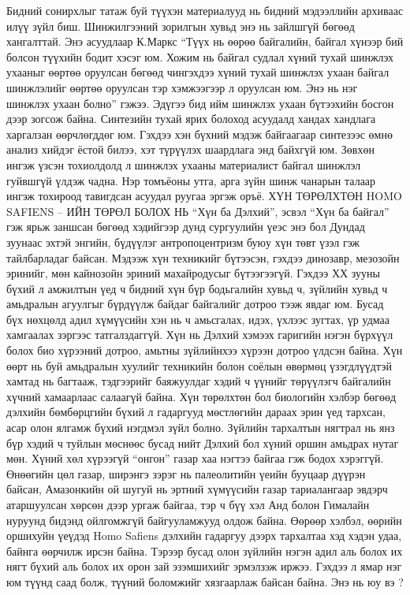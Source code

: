Бидний сонирхлыг татаж буй түүхэн материалууд нь бидний мэдээллийн архиваас илүү зүйл биш. Шинжилгээний зорилгын хувьд энэ нь зайлшгүй бөгөөд хангалттай. Энэ асуудлаар К.Маркс “Түүх нь өөрөө байгалийн, байгал хүнээр бий болсон түүхийн бодит хэсэг юм. Хожим нь байгал судлал хүний тухай шинжлэх ухааныг өөртөө оруулсан бөгөөд чингэхдээ хүний тухай шинжлэх ухаан байгал шинжлэлийг өөртөө оруулсан тэр хэмжээгээр л оруулсан юм. Энэ нь нэг шинжлэх ухаан болно” гэжээ. Эдүгээ бид ийм шинжлэх ухаан бүтээхийн босгон дээр зогсож байна.
Синтезийн тухай ярих болоход асуудалд хандах хандлага харгалзан өөрчлөгддөг юм. Гэхдээ хэн бүхний мэдэж байгаагаар синтезээс өмнө анализ хийдэг ёстой билээ, хэт түрүүлэх шаардлага энд байхгүй юм. Зөвхөн ингэж үзсэн тохиолдолд л шинжлэх ухааны материалист байгал шинжлэл гуйвшгүй үлдэж чадна. Нэр томъёоны утга, арга зүйн шинж чанарын талаар ингэж тохироод тавигдсан асуудал руугаа эргэж оръё.
ХҮН ТӨРӨЛХТӨН HOMO SAFIENS – ИЙН ТӨРӨЛ БОЛОХ НЬ
“Хүн ба Дэлхий”, эсвэл “Хүн ба байгал” гэж ярьж заншсан бөгөөд хэдийгээр дунд сургуулийн үеэс энэ бол Дундад зуунаас эхтэй энгийн, бүдүүлэг антропоцентризм буюу хүн төвт үзэл гэж тайлбарладаг байсан. Мэдээж хүн техникийг бүтээсэн, гэхдээ динозавр, мезозойн эринийг, мөн кайнозойн эриний махайродусыг бүтээгээгүй. Гэхдээ ХХ зууны бүхий л амжилтын үед ч бидний хүн бүр бодьгалийн хувьд ч, зүйлийн хувьд ч амьдралын агуулгыг бүрдүүлж байдаг байгалийг дотроо тээж явдаг юм. Бусад бүх нөхцөлд адил хүмүүсийн хэн нь ч амьсгалах, идэх, үхлээс зугтах, үр удмаа хамгаалах зэргээс татгалздаггүй. Хүн нь Дэлхий хэмээх гаригийн нэгэн бүрхүүл болох био хүрээний дотроо, амьтны зүйлийнхээ хүрээн дотроо үлдсэн байна. Хүн өөрт нь буй амьдралын хуулийг техникийн болон соёлын өвөрмөц үзэгдлүүдтэй хамтад нь багтааж, тэдгээрийг баяжуулдаг хэдий ч үүнийг төрүүлэгч байгалийн хүчний хамаарлаас салаагүй байна.
Хүн төрөлхтөн бол биологийн хэлбэр бөгөөд дэлхийн бөмбөрцгийн бүхий л гадаргууд мөстлөгийн дараах эрин үед тархсан, асар олон ялгамж бүхий нэгдмэл зүйл болно. Зүйлийн тархалтын нягтрал нь янз бүр хэдий ч туйлын мөснөөс бусад нийт Дэлхий бол хүний оршин амьдрах нутаг мөн. Хүний хөл хүрээгүй “онгон” газар хаа нэгтээ байгаа гэж бодох хэрэггүй. Өнөөгийн цөл газар, ширэнгэ зэрэг нь палеолитийн үеийн бууцаар дүүрэн байсан, Амазонкийн ой шугуй нь эртний хүмүүсийн газар тариалангаар эвдэрч атаршуулсан хөрсөн дээр ургаж байгаа, тэр ч бүү хэл Анд болон Гималайн нуруунд бидэнд ойлгомжгүй байгууламжууд олдож байна. Өөрөөр хэлбэл, өөрийн оршихуйн үеүдэд Homo Safiens дэлхийн гадаргуу дээрх тархалтаа хэд хэдэн удаа, байнга өөрчилж ирсэн байна. Тэрээр бусад олон зүйлийн нэгэн адил аль болох их нягт бүхий аль болох их орон зай эзэмшихийг эрмэлзэж иржээ. Гэхдээ л ямар нэг юм түүнд саад болж, түүний боломжийг хязгаарлаж байсан байна. Энэ нь юу вэ ?
